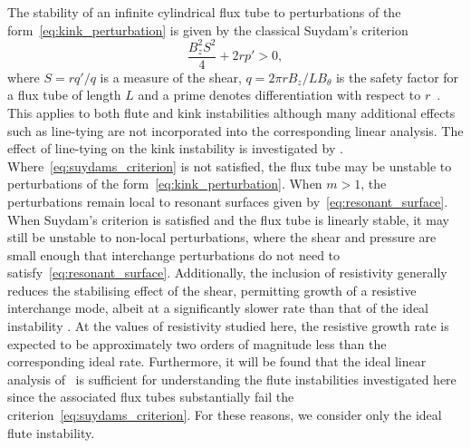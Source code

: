 \documentclass[fleqn,usenatbib]{mnras}
\newcommand{\rev}[1]{{\color{red} {#1}}}
\newcommand{\revcite}[1]{{\color{red} \underline{#1}}}
\begin{document}
The stability of an infinite cylindrical flux tube to perturbations of the
form~\eqref{eq:kink_perturbation} is given by the classical Suydam's
criterion~\citep{suydamStabilityLinearPinch1958}
\begin{equation}
  \label{eq:suydams_criterion}
\frac{B_z^2 S^2}{4} + 2 r p' > 0,
\end{equation}
where $S = r q'/q$ is a measure of the shear, $q = 2\pi r B_z / L B_{\theta}$
is the safety factor for a flux tube of length $L$ and a prime denotes
differentiation with respect to
$r$~\citep{mikhailovskiiInstabilitiesConfinedPlasma1998}. This applies to both
flute and kink instabilities although many additional effects such as
line-tying are not incorporated into the corresponding linear analysis. The
effect of line-tying on the kink instability is investigated
by \revcite{\citet{hoodKinkInstabilitySolar1979}}. Where~\eqref{eq:suydams_criterion} is
not satisfied, the flux tube may be unstable to perturbations of the
form~\eqref{eq:kink_perturbation}. When $m>1$, the perturbations remain local
to resonant surfaces given by~\eqref{eq:resonant_surface}. When Suydam's
criterion is satisfied and the flux tube is linearly stable, it may still be
unstable to non-local perturbations, where the shear and pressure are small
enough that interchange perturbations do not need to
satisfy~\eqref{eq:resonant_surface}. Additionally, the inclusion of resistivity
generally reduces the stabilising effect of the shear, permitting growth of
a resistive interchange mode, albeit at a significantly slower rate than that of the ideal
instability
\citep{mikhailovskiiInstabilitiesConfinedPlasma1998}. \rev{At the
  values of resistivity studied here, the resistive growth rate is
  expected to be approximately two orders of magnitude less than the corresponding ideal rate.} Furthermore, it will be
found that the ideal linear analysis
of~\cite{mikhailovskiiInstabilitiesConfinedPlasma1998} is sufficient for
understanding the flute instabilities investigated here since the associated
flux tubes substantially fail the criterion~\eqref{eq:suydams_criterion}. \rev{For these reasons, we consider only the ideal flute instability.}
\end{document}

